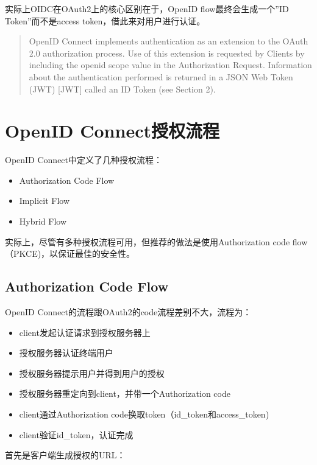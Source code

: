 \documentclass[12pt]{article}
\begin{document}
实际上OIDC在OAuth2上的核心区别在于，OpenID flow最终会生成一个''ID Token''而不是access token，借此来对用户进行认证。

\begin{quote}
OpenID Connect implements authentication as an extension to the OAuth 2.0 authorization process. Use of this extension is requested by Clients by including the openid scope value in the Authorization Request. Information about the authentication performed is returned in a JSON Web Token (JWT) {[}JWT{]} called an ID Token (see Section 2).
\end{quote}

\section{OpenID Connect授权流程}\label{openid-connectux6388ux6743ux6d41ux7a0b}

OpenID Connect中定义了几种授权流程：

\begin{itemize}
\tightlist
\item
  Authorization Code Flow
\item
  Implicit Flow
\item
  Hybrid Flow
\end{itemize}

实际上，尽管有多种授权流程可用，但推荐的做法是使用Authorization code flow（PKCE)，以保证最佳的安全性。

\subsection{Authorization Code Flow}\label{authorization-code-flow}

OpenID Connect的流程跟OAuth2的code流程差别不大，流程为：

\begin{itemize}
\tightlist
\item
  client发起认证请求到授权服务器上
\item
  授权服务器认证终端用户
\item
  授权服务器提示用户并得到用户的授权
\item
  授权服务器重定向到client，并带一个Authorization code
\item
  client通过Authorization code换取token（id\_token和access\_token)
\item
  client验证id\_token，认证完成
\end{itemize}

首先是客户端生成授权的URL：
\end{document}
